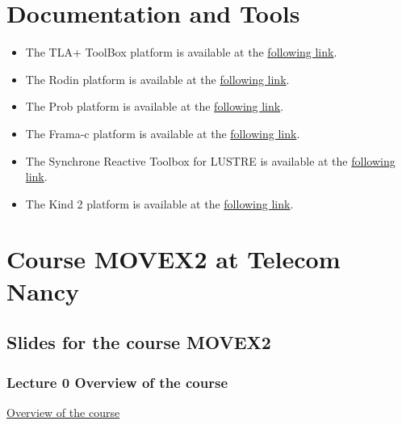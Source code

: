 \documentclass[ 12pt]{article}
\begin{document}
\tableofcontents


\section{Documentation and Tools}

\begin{itemize}

    
\item[]  The  TLA+ ToolBox  platform is available at the 
  \href{https://lamport.azurewebsites.net/tla/toolbox.html}{following 
    link}. 
\item[]  The Rodin platform is available at the 
  \href{https://www.event-b.org/install.html}{following 
    link}.

  
  \item[]  The Prob   platform is available at the 
  \href{https://prob.hhu.de}{following 
    link}. 

  
  \item[]  The Frama-c platform is available at the 
  \href{https://www.frama-c.com}{following 
    link}.

  \item[]  The Synchrone Reactive Toolbox for LUSTRE is   available at the 
  \href{https://www-verimag.imag.fr/Outils-SynchronesNEW.html?lang=en}{following 
    link}.

  \item[]  The Kind 2  platform is available at the 
  \href{ https://kind2-mc.github.io/kind2/}{following 
    link}.

  
\end{itemize}



\section{Course MOVEX2 at Telecom Nancy}
\label{sec:course-mcfsi-at}


\subsection{Slides for the course MOVEX2}
\label{sec:slides}


\subsubsection{Lecture 0  {Overview of the course }}
  
  \href{http://mery54.github.io/teaching/movex/lecturesnotes/movexlecture6.pdf}{Overview of the course }
\end{document}
